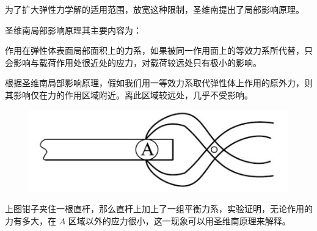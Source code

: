 \documentclass[12pt,a4paper]{article}
\begin{document}
为了扩大弹性力学解的适用范围，放宽这种限制，圣维南提出了局部影响原理。

圣维南局部影响原理其主要内容为：

 作用在弹性体表面局部面积上的力系，如果被同一作用面上的等效力系所代替，只会影响与载荷作用处很近处的应力，对载荷较远处只有极小的影响。

根据圣维南局部影响原理，假如我们用一等效力系取代弹性体上作用的原外力，则其影响仅在力的作用区域附近。离此区域较远处，几乎不受影响。

\begin{figure}[H]
\centering
\includegraphics[scale=0.4]{./figures/27.png}
\caption{}
\end{figure}

上图钳子夹住一根直杆，那么直杆上加上了一组平衡力系，实验证明，无论作用的力有多大，在 $A$ 区域以外的应力很小，这一现象可以用圣维南原理来解释。







%

%
\end{document}
